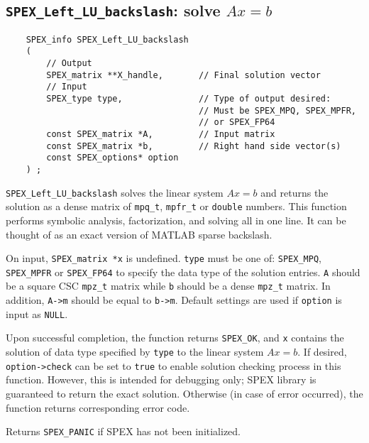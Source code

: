 \documentclass[12pt]{report}
\theoremstyle{definition}
\begin{document}
\cprotect\subsection{\verb|SPEX_Left_LU_backslash|: solve $Ax=b$}
\label{ss:SPEX_Left_LU_backslash}

\begin{mdframed}[userdefinedwidth=6in]
{\footnotesize
\begin{verbatim}
    SPEX_info SPEX_Left_LU_backslash
    (
        // Output
        SPEX_matrix **X_handle,       // Final solution vector
        // Input
        SPEX_type type,               // Type of output desired:
                                      // Must be SPEX_MPQ, SPEX_MPFR,
                                      // or SPEX_FP64
        const SPEX_matrix *A,         // Input matrix
        const SPEX_matrix *b,         // Right hand side vector(s)
        const SPEX_options* option
    ) ;
\end{verbatim}
} \end{mdframed}

\verb|SPEX_Left_LU_backslash| solves the linear system $Ax=b$ and returns the solution
as a dense matrix of \verb|mpq_t|, \verb|mpfr_t| or \verb|double| numbers. This
function performs symbolic analysis, factorization, and solving all in one line. 
It can be thought of as an exact version of MATLAB sparse backslash.

On input, \verb|SPEX_matrix *x| is undefined. \verb|type| must be one of:
\verb|SPEX_MPQ|, \verb|SPEX_MPFR| or \verb|SPEX_FP64| to specify the data type
of the solution entries. \verb|A| should be a square CSC \verb|mpz_t| matrix
while \verb|b| should be a dense \verb|mpz_t| matrix. In addition, \verb|A->m|
should be equal to \verb|b->m|.  Default settings are used if
\verb|option| is input as \verb|NULL|.

Upon successful completion, the function returns \verb|SPEX_OK|, and
\verb|x| contains the solution of data type specified by
\verb|type| to the linear system $Ax=b$. If desired, \verb|option->check| can
be set to \verb|true| to enable solution checking process in this function.
However, this is intended for debugging only; SPEX library is guaranteed to
return the exact solution. Otherwise (in case of error occurred), the function
returns corresponding error code.

Returns \verb|SPEX_PANIC| if SPEX has not been initialized.
\end{document}
